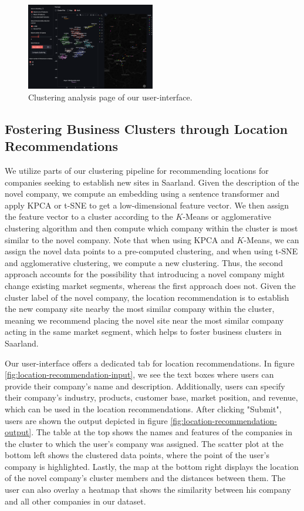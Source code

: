 \documentclass[conference]{IEEEtran}
\begin{document}
\begin{figure}[H]
	\centering
	\includegraphics[width=0.5\textwidth]{figures/clustering_analysis.png}
	\caption{Clustering analysis page of our user-interface.}
	\label{fig:clustering-analysis}
\end{figure}

\subsection{Fostering Business Clusters through Location Recommendations}
We utilize parts of our clustering pipeline for recommending locations for companies seeking to establish new sites in Saarland. Given the description of the novel company, we compute an embedding using a sentence transformer and apply KPCA or t-SNE to get a low-dimensional feature vector. We then assign the feature vector to a cluster according to the $K$-Means or agglomerative clustering algorithm and then compute which company within the cluster is most similar to the novel company. Note that when using KPCA and $K$-Means, we can assign the novel data points to a pre-computed clustering, and when using t-SNE and agglomerative clustering, we compute a new clustering.
Thus, the second approach accounts for the possibility that introducing a novel company might change existing market segments, whereas the first approach does not.
Given the cluster label of the novel company, the location recommendation is to establish the new company site nearby the most similar company within the cluster, meaning we recommend placing the novel site near the most similar company acting in the same market segment, which helps to foster business clusters in Saarland.

Our user-interface offers a dedicated tab for location recommendations. In figure \ref{fig:location-recommendation-input}, we see the text boxes where users can provide their company's name and description. Additionally, users can specify their company's industry, products, customer base, market position, and revenue, which can be used in the location recommendations. After clicking "Submit", users are shown the output depicted in figure \ref{fig:location-recommendation-output}. The table at the top shows the names and features of the companies in the cluster to which the user's company was assigned. The scatter plot at the bottom left shows the clustered data points, where the point of the user's company is highlighted. Lastly, the map at the bottom right displays the location of the novel company's cluster members and the distances between them. The user can also overlay a heatmap that shows the similarity between his company and all other companies in our dataset.
\end{document}
